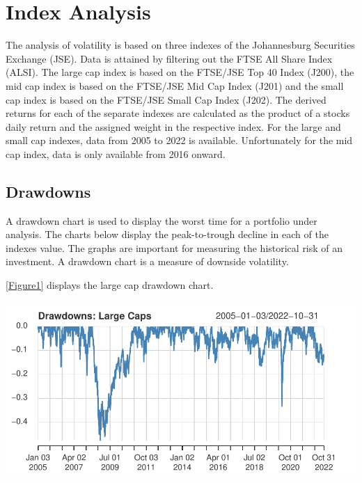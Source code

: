 \documentclass[11pt,preprint, authoryear]{elsarticle}
\let\origfigure\figure
\let\endorigfigure\endfigure
\renewenvironment{figure}[1][2] {
    \expandafter\origfigure\expandafter[H]
} {
    \endorigfigure
}
\numberwithin{equation}{section}
\numberwithin{figure}{section}
\numberwithin{table}{section}
\begin{document}
\hypertarget{index-analysis}{%
\section{\texorpdfstring{Index Analysis
\label{Index}}{Index Analysis }}\label{index-analysis}}

The analysis of volatility is based on three indexes of the Johannesburg
Securities Exchange (JSE). Data is attained by filtering out the FTSE
All Share Index (ALSI). The large cap index is based on the FTSE/JSE Top
40 Index (J200), the mid cap index is based on the FTSE/JSE Mid Cap
Index (J201) and the small cap index is based on the FTSE/JSE Small Cap
Index (J202). The derived returns for each of the separate indexes are
calculated as the product of a stocks daily return and the assigned
weight in the respective index. For the large and small cap indexes,
data from 2005 to 2022 is available. Unfortunately for the mid cap
index, data is only available from 2016 onward.

\hypertarget{drawdowns}{%
\subsection{Drawdowns}\label{drawdowns}}

A drawdown chart is used to display the worst time for a portfolio under
analysis. The charts below display the peak-to-trough decline in each of
the indexes value. The graphs are important for measuring the historical
risk of an investment. A drawdown chart is a measure of downside
volatility.

\ref{Figure1} displays the large cap drawdown chart.

\begin{figure}[H]

{\centering \includegraphics{Volatility-of-Shares_files/figure-latex/Figure1-1} 

}

\caption{Large Cap drawdown chart \label{Figure1}}\label{fig:Figure1}
\end{figure}
\end{document}
